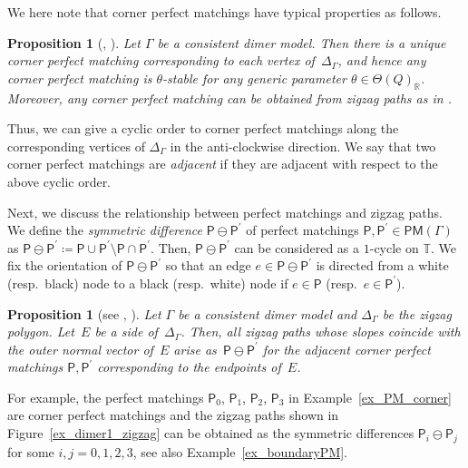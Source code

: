 \documentclass[pdftex]{sigma}
\numberwithin{equation}{section}
\newtheorem{Proposition}[Theorem]{Proposition}
\theoremstyle{definition}
\newcommand{\RR}{\mathbb{R}}
\newcommand{\TT}{\mathbb{T}}
\newcommand{\sfP}{\mathsf{P}}
\newcommand{\PM}{\mathsf{PM}}
\begin{document}
We here note that corner perfect matchings have typical properties as follows.

\begin{Proposition}[{\cite[Corollary~4.27]{Bro_dimer}, \cite[Proposition~9.2]{IU_special}}]
\label{prop_cPM_unique}
Let $\Gamma$ be a consistent dimer model.
Then there is a unique corner perfect matching corresponding to each vertex of~$\Delta_\Gamma$,
and hence any corner perfect matching is $\theta$-stable for any generic parameter $\theta\in\Theta(Q)_\RR$.
Moreover, any corner perfect matching can be obtained from zigzag paths as in {\rm \cite[\emph{Section}~8]{IU_special}}.
\end{Proposition}

Thus, we can give a cyclic order to corner perfect matchings along the corresponding vertices of $\Delta_\Gamma$ in the anti-clockwise direction.
We say that two corner perfect matchings are \emph{adjacent} if they are adjacent with respect to the above cyclic order.

Next, we discuss the relationship between perfect matchings and zigzag paths.
We define the \emph{symmetric difference} $\sfP\ominus\sfP^\prime$ of perfect matchings $\sfP, \sfP^\prime\in\PM(\Gamma)$ as
$\sfP\ominus\sfP^\prime\coloneqq\sfP\cup\sfP^\prime{\setminus}\sfP\cap\sfP^\prime$.
Then, $\sfP\ominus\sfP^\prime$ can be considered as a $1$-cycle on $\TT$.
We fix the orientation of $\sfP\ominus\sfP^\prime$ so that an edge $e\in \sfP\ominus\sfP^\prime$ is directed
from a white (resp.\ black) node to a black (resp.\ white) node if $e\in\sfP$ (resp.\ $e\in\sfP^\prime$).

\begin{Proposition} [{see \cite[Corollary~3.8]{Gul}, \cite[Step~1 of the proof of Proposition~9.2, Corollary~9.3]{IU_special}}]\label{zigzag_sidepolygon}
Let $\Gamma$ be a consistent dimer model and $\Delta_\Gamma$ be the zigzag polygon.
Let~$E$ be a side of~$\Delta_\Gamma$.
Then, all zigzag paths whose slopes coincide with the outer normal vector of~$E$ arise as~$\sfP\ominus\sfP^\prime$
for the adjacent corner perfect matchings $\sfP,\sfP^\prime$ corresponding to the endpoints of~$E$.
\end{Proposition}

For example, the perfect matchings $\sfP_0$, $\sfP_1$, $\sfP_2$, $\sfP_3$ in Example~\ref{ex_PM_corner} are corner perfect matchings and
the zigzag paths shown in Figure~\ref{ex_dimer1_zigzag} can be obtained as the symmetric differences $\sfP_i\ominus\sfP_j$ for some $i, j=0, 1, 2, 3$,
see also Example~\ref{ex_boundaryPM}.
\end{document}
